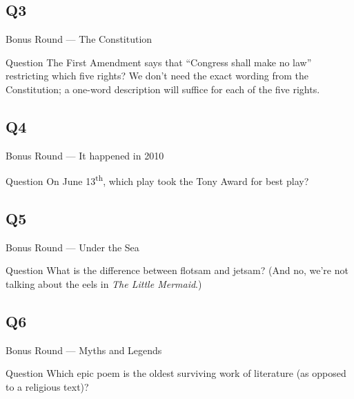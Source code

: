 \documentclass[11pt,draft]{beamer}
\begin{document}
\subsection*{Q3}
\begin{frame}[t]{Bonus Round --- The Constitution}
    \begin{block}{Question}
        The First Amendment says that ``Congress shall make no law'' restricting which five rights? We don't need the exact wording from the Constitution; a one-word description will suffice for each of the five rights.
    \end{block}
\end{frame}
\subsection*{Q4}
\begin{frame}[t]{Bonus Round --- It happened in 2010}
    \begin{block}{Question}
        On June 13\textsuperscript{th}, which play took the Tony Award for best play?
    \end{block}
\end{frame}
\subsection*{Q5}
\begin{frame}[t]{Bonus Round --- Under the Sea}
    \begin{block}{Question}
        What is the difference between flotsam and jetsam? (And no, we're not talking about the eels in \emph{The Little Mermaid}.)
    \end{block}
\end{frame}
\subsection*{Q6}
\begin{frame}[t]{Bonus Round --- Myths and Legends}
    \begin{block}{Question}
        Which epic poem is the oldest surviving work of literature (as opposed to a religious text)?
    \end{block}
\end{frame}
\end{document}
